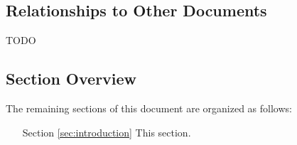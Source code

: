 \subsection{Relationships to Other Documents}
\label{sec:introduction:relationships}

TODO

\subsection{Section Overview}
\label{sec:introduction:sections}

The remaining sections of this document are organized as follows:
\vspace*{2mm}
\begin{itemize}[leftmargin=2cm,rightmargin=0pt,labelwidth=2cm,labelsep=0pt,itemindent=0pt,parsep=0.1cm,topsep=0.1cm,align=left]

\item[Section \ref{sec:introduction}]
This section.

\end{itemize}

